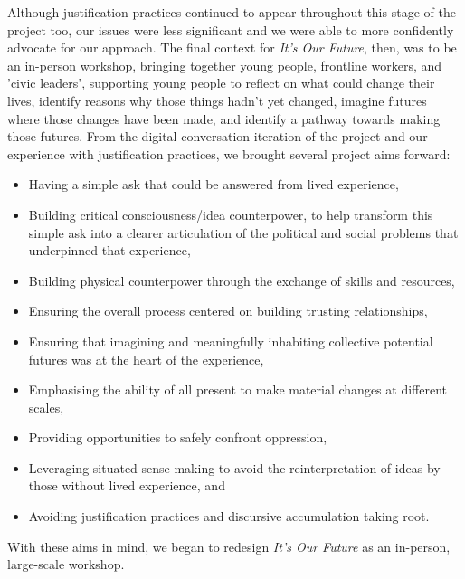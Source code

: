 Although justification practices continued to appear throughout this stage of the project too, our issues were less significant and we were able to more confidently advocate for our approach. The final context for \textit{It's Our Future}, then, was to be an in-person workshop, bringing together young people, frontline workers, and 'civic leaders', supporting young people to reflect on what could change their lives, identify reasons why those things hadn't yet changed, imagine futures where those changes have been made, and identify a pathway towards making those futures. From the digital conversation iteration of the project and our experience with justification practices, we brought several project aims forward:
\begin{itemize}
\item Having a simple ask that could be answered from lived experience,
    \item Building critical consciousness/idea counterpower, to help transform this simple ask into a clearer articulation of the political and social problems that underpinned that experience,
    \item Building physical counterpower through the exchange of skills and resources,
    \item Ensuring the overall process centered on building trusting relationships,
    \item Ensuring that imagining and meaningfully inhabiting collective potential futures was at the heart of the experience,
    \item Emphasising the ability of all present to make material changes at different scales,
    \item Providing opportunities to safely confront oppression,
    \item Leveraging situated sense-making to avoid the reinterpretation of ideas by those without lived experience, and
    \item Avoiding justification practices and discursive accumulation taking root. 
\end{itemize}
With these aims in mind, we began to redesign \textit{It's Our Future} as an in-person, large-scale workshop.

